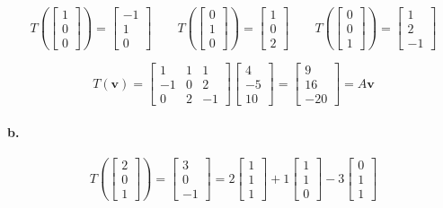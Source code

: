 \documentclass{report}
\begin{document}
$$
T \left( \begin{bmatrix} 1 \\ 0 \\ 0 \end{bmatrix} \right)= \begin{bmatrix} - 1 \\  1 \\ 0 \end{bmatrix} \quad \quad T \left( \begin{bmatrix} 0 \\1 \\ 0 \end{bmatrix}\right) = \begin{bmatrix} 1 \\ 0 \\ 2 \end{bmatrix} \quad \quad T \left( \begin{bmatrix} 0 \\ 0 \\ 1 \end{bmatrix} \right) = \begin{bmatrix} 1 \\ 2 \\ -1 \end{bmatrix} 
$$

$$
T(\bm{v}) = \begin{bmatrix} 1 & 1 & 1 \\ -1 & 0 & 2 \\ 0 & 2 &-1 \end{bmatrix} \begin{bmatrix} 4 \\ -5 \\ 10 \end{bmatrix} = \begin{bmatrix} 9 \\ 16 \\ -20 \end{bmatrix} = A \bm{v}
$$

\paragraph{b.}

$$
T \left( \begin{bmatrix} 2 \\ 0 \\ 1 \end{bmatrix} \right) = \begin{bmatrix} 3 \\ 0 \\ -1 \end{bmatrix} = 2 \begin{bmatrix} 1 \\ 1 \\ 1 \end{bmatrix} + 1 \begin{bmatrix} 1 \\ 1 \\ 0 \end{bmatrix} -3 \begin{bmatrix} 0 \\ 1 \\ 1 \end{bmatrix} 
$$
\end{document}
